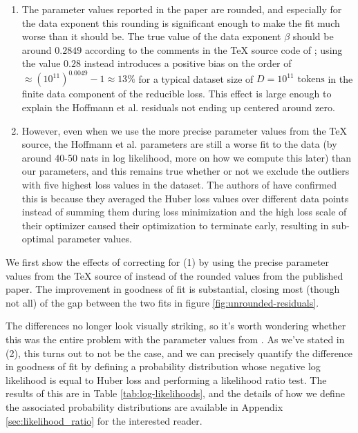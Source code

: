 \documentclass[twocolumn]{article}
\begin{document}
\begin{enumerate}
    \item The parameter values reported in the paper are rounded, and especially for the data exponent this rounding is significant enough to make the fit much worse than it should be. The true value of the data exponent \( \beta \) should be around \( 0.2849 \) according to the comments in the TeX source code of \cite{hoffmann2022training}; using the value \( 0.28 \) instead introduces a positive bias on the order of \( \approx (10^{11})^{0.0049} - 1 \approx 13 \% \) for a typical dataset size of \( D = 10^{11} \text{ tokens} \) in the finite data component of the reducible loss. This effect is large enough to explain the Hoffmann et al. residuals not ending up centered around zero.

    \item However, even when we use the more precise parameter values from the TeX source, the Hoffmann et al. parameters are still a worse fit to the data (by around 40-50 nats in log likelihood, more on how we compute this later) than our parameters, and this remains true whether or not we exclude the outliers with five highest loss values in the dataset. The authors of \cite{hoffmann2022training} have confirmed this is because they averaged the Huber loss values over different data points instead of summing them during loss minimization and the high loss scale of their optimizer caused their optimization to terminate early, resulting in sub-optimal parameter values.
\end{enumerate}

We first show the effects of correcting for (1) by using the precise parameter values from the TeX source of \cite{hoffmann2022training} instead of the rounded values from the published paper. The improvement in goodness of fit is substantial, closing most (though not all) of the gap between the two fits in figure \ref{fig:unrounded-residuals}.

The differences no longer look visually striking, so it's worth wondering whether this was the entire problem with the parameter values from \cite{hoffmann2022training}. As we've stated in (2), this turns out to not be the case, and we can precisely quantify the difference in goodness of fit by defining a probability distribution whose negative log likelihood is equal to Huber loss and performing a likelihood ratio test. The results of this are in Table \ref{tab:log-likelihoods}, and the details of how we define the associated probability distributions are available in Appendix \ref{sec:likelihood_ratio} for the interested reader.
\end{document}
